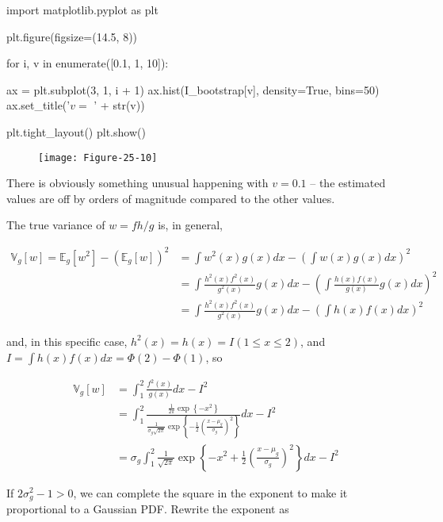 \begin{python}
import matplotlib.pyplot as plt

plt.figure(figsize=(14.5, 8))

for i, v in enumerate([0.1, 1, 10]):
    
    ax = plt.subplot(3, 1, i + 1)
    ax.hist(I_bootstrap[v], density=True, bins=50)
    ax.set_title('$v = $ ' + str(v))

plt.tight_layout()
plt.show()
\end{python}

\begin{figure}[H]
\centering
\texttt{[image: Figure-25-10]}
\end{figure}

There is obviously something unusual happening with \(v = 0.1\) -- the
estimated values are off by orders of magnitude compared to the other
values.

The true variance of \(w = f h / g\) is, in general,

\begin{align*}
\mathbb{V}_g[w] = \mathbb{E}_g[w^{2}] - (\mathbb{E}_g[w])^{2} &= \int w^{2}(x) g(x) dx - \left( \int w(x) g(x) dx \right)^{2} \\
&= \int \frac{h^{2}(x) f^{2}(x)}{g^{2}(x)} g(x) dx - \left( \int \frac{h(x) f(x)}{g(x)} g(x) dx \right)^{2} \\
&= \int \frac{h^{2}(x) f^{2}(x)}{g^{2}(x)} g(x) dx - \left( \int h(x) f(x) dx \right)^{2}
\end{align*}

and, in this specific case, \(h^{2}(x) = h(x) = I(1 \leq x \leq 2)\), and
\(I = \int h(x) f(x) dx = \Phi(2) - \Phi(1)\), so

\begin{align*}
\mathbb{V}_g[w] &= \int_{1}^{2} \frac{f^{2}(x)}{g(x)} dx - I^{2} \\
&= \int_{1}^{2} \frac{\frac{1}{2 \pi} \exp \left\{-x^{2} \right\}}{\frac{1}{\sigma_g \sqrt{2 \pi}} \exp \left\{-\frac{1}{2} \left(\frac{x - \mu_g}{\sigma_g}\right)^{2} \right\} } dx - I^{2} \\
&= \sigma_g \int_{1}^{2} \frac{1}{\sqrt{2 \pi}} \exp \left\{ -x^{2} +\frac{1}{2} \left(\frac{x - \mu_g}{\sigma_g}\right)^{2} \right\} dx - I^{2}
\end{align*}

If \(2 \sigma_g^{2} - 1 > 0\), we can complete the square in the exponent
to make it proportional to a Gaussian PDF. Rewrite the exponent as

